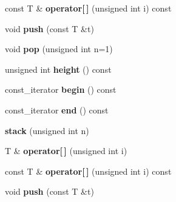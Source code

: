 \begin{DoxyCompactItemize}
\item 
\hypertarget{classyy_1_1stack_a46778e0ee1fd32a559008d5a261df098}{const T \& {\bfseries operator\mbox{[}$\,$\mbox{]}} (unsigned int i) const }\label{classyy_1_1stack_a46778e0ee1fd32a559008d5a261df098}

\item 
\hypertarget{classyy_1_1stack_a5ff563955472eca36f73f6e840df2963}{void {\bfseries push} (const T \&t)}\label{classyy_1_1stack_a5ff563955472eca36f73f6e840df2963}

\item 
\hypertarget{classyy_1_1stack_a0800c0a796cade80c3ce9a785dc87564}{void {\bfseries pop} (unsigned int n=1)}\label{classyy_1_1stack_a0800c0a796cade80c3ce9a785dc87564}

\item 
\hypertarget{classyy_1_1stack_a968303842836fd4e9e3994a4e3984191}{unsigned int {\bfseries height} () const }\label{classyy_1_1stack_a968303842836fd4e9e3994a4e3984191}

\item 
\hypertarget{classyy_1_1stack_a3939df081955a4ad78e14eeb9b2b5dbf}{const\-\_\-iterator {\bfseries begin} () const }\label{classyy_1_1stack_a3939df081955a4ad78e14eeb9b2b5dbf}

\item 
\hypertarget{classyy_1_1stack_a27ade5b933a4dc8a27960c88addda2a0}{const\-\_\-iterator {\bfseries end} () const }\label{classyy_1_1stack_a27ade5b933a4dc8a27960c88addda2a0}

\item 
\hypertarget{classyy_1_1stack_af4277ae80177abc36f242c3646cbcfbe}{{\bfseries stack} (unsigned int n)}\label{classyy_1_1stack_af4277ae80177abc36f242c3646cbcfbe}

\item 
\hypertarget{classyy_1_1stack_a1058b8b7e1a3e0aa7b1e6f2f1a62c234}{T \& {\bfseries operator\mbox{[}$\,$\mbox{]}} (unsigned int i)}\label{classyy_1_1stack_a1058b8b7e1a3e0aa7b1e6f2f1a62c234}

\item 
\hypertarget{classyy_1_1stack_a46778e0ee1fd32a559008d5a261df098}{const T \& {\bfseries operator\mbox{[}$\,$\mbox{]}} (unsigned int i) const }\label{classyy_1_1stack_a46778e0ee1fd32a559008d5a261df098}

\item 
\hypertarget{classyy_1_1stack_a5ff563955472eca36f73f6e840df2963}{void {\bfseries push} (const T \&t)}\label{classyy_1_1stack_a5ff563955472eca36f73f6e840df2963}


\end{DoxyCompactItemize}
